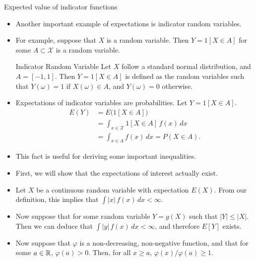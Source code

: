 \begin{frame}[allowframebreaks]{Expected value of indicator functions}
  \begin{itemize}
    \item Another important example of expectations is \alert{indicator} random variables.
    \item For example, suppose that $X$ is a random variable. Then $Y = 1[X \in A]$ for some $A \subset \mathcal{X}$ is a random variable.
    
    \begin{exampleblock}{Indicator Random Variable}
      Let $X$ follow a standard normal distribution, and $A = [-1, 1]$. Then $Y = 1[X \in A]$ is defined as the random variables such that $Y(\omega) = 1$ if $X(\omega) \in A$, and $Y(\omega) = 0$ otherwise.
    \end{exampleblock}
    
    \framebreak
    
    \item Expectations of indicator variables are \alert{probabilities}. Let $Y = 1[X \in A]$. 
    \begin{align*}
    E(Y) &= E\big(1[X \in A]\big) \\
    &= \int_{x \in \mathcal{X}} 1[X \in A]\, f(x) \, dx \\
    & = \int_{x \in A} f(x) \, dx = P(X \in A).
    \end{align*}
    \item This fact is useful for deriving some important inequalities.
    \item First, we will show that the expectations of interest actually exist.
    
    \framebreak
    
    \item Let $X$ be a continuous random variable with expectation $E(X)$. From our definition, this implies that $\int |x|\, f(x)\,dx < \infty$.
    \item Now suppose that for some random variable $Y = g(X)$ such that $|Y| \leq |X|$. Then we can deduce that $\int |y|\, f(x)\,dx < \infty$, and therefore $E[Y]$ exists.
    \item Now suppose that $\varphi$ is a non-decreasing, non-negative function, and that for some $a \in \mathbb{R}$, $\varphi(a) > 0$. Then, for all $x \geq a$, $\varphi(x) / \varphi(a) \geq 1$.
    
    \framebreak
    

\end{itemize}
\end{frame}
